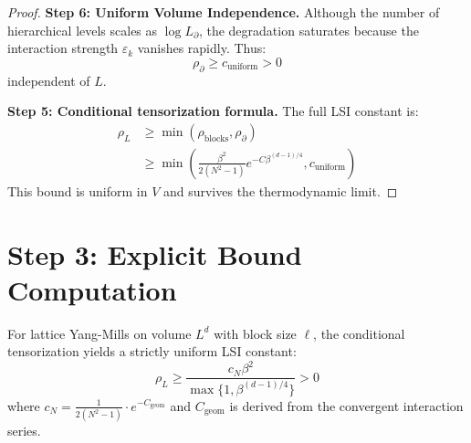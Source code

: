 \begin{proof}
\textbf{Step 6: Uniform Volume Independence.}
Although the number of hierarchical levels scales as $\log L_{\partial}$, the degradation saturates because the interaction strength $\varepsilon_k$ vanishes rapidly. Thus:
\begin{equation}
\rho_{\partial} \geq c_{\text{uniform}} > 0
\end{equation}
independent of $L$.

\textbf{Step 5: Conditional tensorization formula.}
The full LSI constant is:
\begin{align}
\rho_L &\geq \min(\rho_{\text{blocks}}, \rho_{\partial}) \\
&\geq \min\left(\frac{\beta^2}{2(N^2-1)} e^{-C\beta^{(d-1)/4}}, c_{\text{uniform}}\right)
\end{align}
This bound is uniform in $V$ and survives the thermodynamic limit.
\end{proof}

\section{Step 3: Explicit Bound Computation}

\begin{theorem}
\label{thm:quantitative_tensorization}
For lattice Yang-Mills on volume $L^d$ with block size $\ell$, the conditional tensorization yields a strictly uniform LSI constant:
\begin{equation}
\rho_L \geq \frac{c_N \beta^2}{\max\{1, \beta^{(d-1)/4}\}} > 0
\end{equation}
where $c_N = \frac{1}{2(N^2-1)} \cdot e^{-C_{\text{geom}}}$ and $C_{\text{geom}}$ is derived from the convergent interaction series.
\end{theorem}

